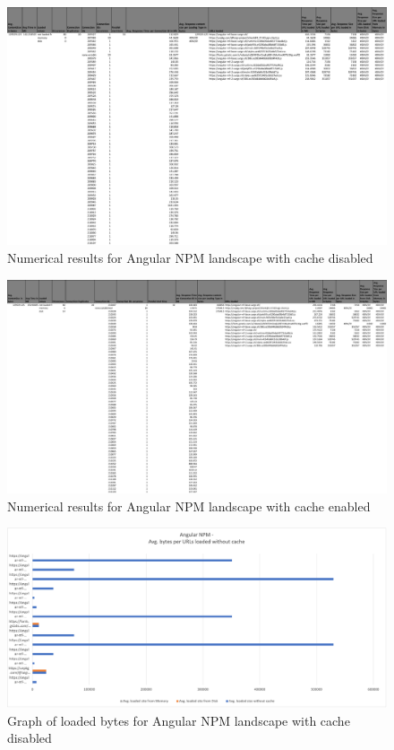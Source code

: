 \begin{figure}[!h]
	\centering
	\begin{adjustbox}{width=\textwidth,totalheight=0.7\textheight}
		\includegraphics[angle=90]{Figures/angular_npm_allhar.pdf}
	\end{adjustbox}
	\caption{Numerical results for Angular NPM landscape with cache disabled}
	\label{fig:appendix_1_1}
\end{figure}
\newpage
\begin{figure}[!h]
	\centering
	\begin{adjustbox}{width=\textwidth,totalheight=0.95\textheight}
		\includegraphics[angle=90]{Figures/angular_npm_allhar_cache.pdf}
	\end{adjustbox}
	\caption{Numerical results for Angular NPM landscape with cache enabled}
	\label{fig:appendix_1_2}
\end{figure}
\newpage
\begin{figure}[!h]
	\centering
	\includegraphics[width=1.4\textwidth, angle=90]{Figures/angular_npm_bytes.png}
	\caption{Graph of loaded bytes for Angular NPM landscape with cache disabled}
	\label{fig:appendix_1_3}
\end{figure}
